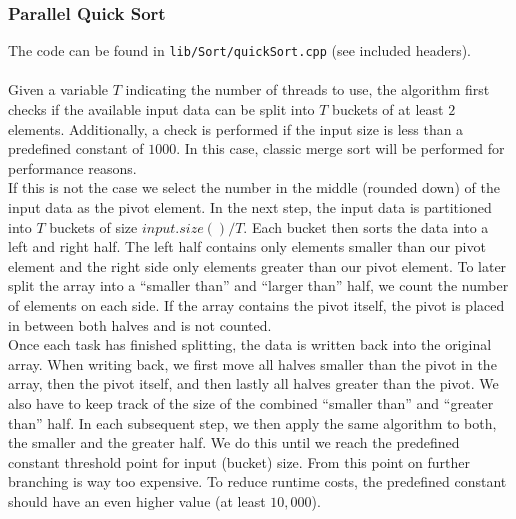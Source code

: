 \documentclass[twocolumn]{article}
\begin{document}
\subsubsection{Parallel Quick Sort}
The code can be found in \texttt{lib/Sort/quickSort.cpp} (see included headers).\\ 
\\
Given a variable $T$ indicating the number of threads to use, the algorithm first checks if the available input data can be split into $T$ buckets of at least $2$ elements. 
Additionally, a check is performed if the input size is less than a predefined constant of $1000$. 
In this case, classic merge sort will be performed for performance reasons.\\
If this is not the case we select the number in the middle (rounded down) of the input data as the pivot element. 
In the next step, the input data is partitioned into $T$ buckets of size $input.size()/T$. Each bucket then sorts the data into a left and right half. 
The left half contains only elements smaller than our pivot element and the right side only elements greater than our pivot element. 
To later split the array into a ``smaller than'' and ``larger than'' half, we count the number of elements on each side. 
If the array contains the pivot itself, the pivot is placed in between both halves and is not counted.\\
Once each task has finished splitting, the data is written back into the original array. 
When writing back, we first move all halves smaller than the pivot in the array, then the pivot itself, and then lastly all halves greater than the pivot. 
We also have to keep track of the size of the combined ``smaller than'' and ``greater than'' half. 
In each subsequent step, we then apply the same algorithm to both, the smaller and the greater half. 
We do this until we reach the predefined constant threshold point for input (bucket) size. 
From this point on further branching is way too expensive. 
To reduce runtime costs, the predefined constant should have an even higher value (at least $10,000$).
\end{document}
